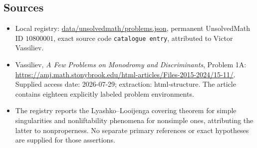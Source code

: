 \documentclass[11pt]{article}
\begin{document}
\subsection{Sources}
\begin{itemize}
\item Local registry: \url{data/unsolvedmath/problems.json}, permanent UnsolvedMath ID $10800001$, exact source code \texttt{catalogue entry}, attributed to Victor Vassiliev.
\item Vassiliev, \emph{A Few Problems on Monodromy and Discriminants}, Problem 1A: \url{https://amj.math.stonybrook.edu/html-articles/Files-2015-2024/15-11/}. Supplied access date: 2026-07-29; extraction: html-structure. The article contains eighteen explicitly labeled problem environments.
\item The registry reports the Lyashko--Looijenga covering theorem for simple singularities and nonliftability phenomena for nonsimple ones, attributing the latter to nonproperness. No separate primary references or exact hypotheses are supplied for those assertions.
\end{itemize}
\end{document}

